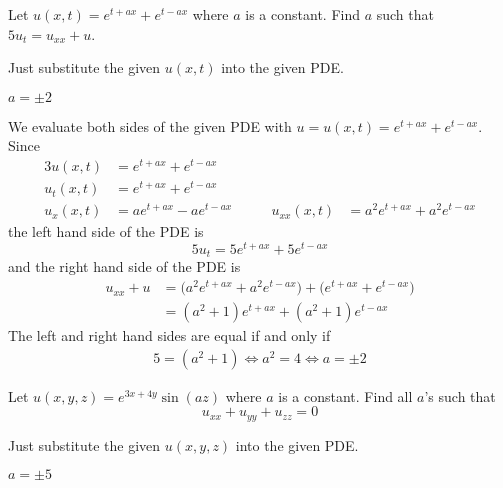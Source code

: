 \begin{question}[M253 2013A] %
Let $u(x,t) = e^{t+ax} + e^{t-ax}$ where $a$ is a constant. Find $a$ such that
$5u_t = u_{xx} + u$.
\end{question}

\begin{hint}
Just substitute the given $u(x,t)$ into the given PDE.
\end{hint}

\begin{answer}
$a=\pm 2$
\end{answer}

\begin{solution}
We evaluate both sides of the given PDE with $u=u(x,t) = e^{t+ax} + e^{t-ax}$.
Since
\begin{alignat*}{3}
u(x,t) &=  e^{t+ax} + e^{t-ax} \\
u_t(x,t) &=  e^{t+ax} + e^{t-ax} \\
u_x(x,t) &=  ae^{t+ax} - ae^{t-ax}\qquad &
u_{xx}(x,t) &=  a^2e^{t+ax} + a^2e^{t-ax}
\end{alignat*}
the left hand side of the PDE is
\begin{equation*}
5u_t = 5e^{t+ax} + 5e^{t-ax}
\end{equation*}
and the right hand side of the PDE is
\begin{align*}
u_{xx} + u
&=\big(a^2e^{t+ax} + a^2e^{t-ax}\big)+\big(e^{t+ax} + e^{t-ax}\big) \\
&= (a^2+1)e^{t+ax} + (a^2+1)e^{t-ax}
\end{align*}
The left and right hand sides are equal if and only if
\begin{align*}
5=(a^2+1) \iff a^2=4 \iff a=\pm 2
\end{align*}
\end{solution}

\begin{question}
Let $u(x,y,z) = e^{3x+4y}\sin(az)$ where $a$ is a constant. Find all $a$'s 
such that 
\begin{equation*}
u_{xx}+u_{yy}+u_{zz}=0
\end{equation*}
\end{question}

\begin{hint}
Just substitute the given $u(x,y,z)$ into the given PDE.
\end{hint}

\begin{answer}
$a=\pm 5$
\end{answer}

